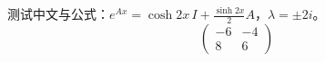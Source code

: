 ﻿\documentclass[11pt]{ctexart}
\begin{document}
测试中文与公式：$e^{Ax}=\cosh 2x\,I+\frac{\sinh 2x}{2}A$，$\lambda=\pm 2i$。
\begin{equation}
\begin{pmatrix}-6&-4\\8&6\end{pmatrix}
\end{equation}
\end{document}
